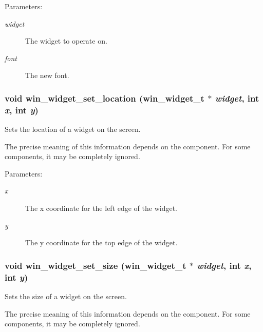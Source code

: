\begin{Desc}
\item[Parameters:]
\begin{description}
\item[{\em widget}]The widget to operate on. \item[{\em font}]The new font. \end{description}
\end{Desc}
\subsubsection{\setlength{\rightskip}{0pt plus 5cm}void win\_\-widget\_\-set\_\-location ({\bf win\_\-widget\_\-t} $\ast$ {\em widget}, int {\em x}, int {\em y})}\label{winwidget_8h_a8}


Sets the location of a widget on the screen. 

The precise meaning of this information depends on the component. For some components, it may be completely ignored.

\begin{Desc}
\item[Parameters:]
\begin{description}
\item[{\em x}]The x coordinate for the left edge of the widget. \item[{\em y}]The y coordinate for the top edge of the widget. \end{description}
\end{Desc}
\subsubsection{\setlength{\rightskip}{0pt plus 5cm}void win\_\-widget\_\-set\_\-size ({\bf win\_\-widget\_\-t} $\ast$ {\em widget}, int {\em x}, int {\em y})}\label{winwidget_8h_a10}


Sets the size of a widget on the screen. 

The precise meaning of this information depends on the component. For some components, it may be completely ignored.

